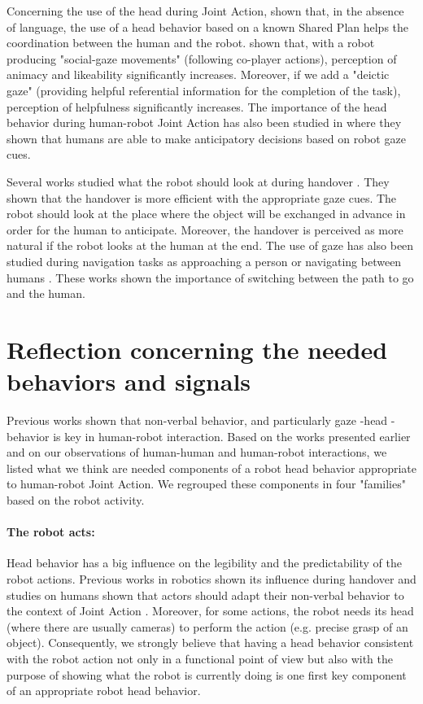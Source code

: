 \documentclass[english,a4paper,11pt,twoside]{StyleThese}
\begin{document}
Concerning the use of the head during Joint Action, \cite{lallee2013cooperative} shown that, in the absence of language, the use of a head behavior based on a known Shared Plan helps the coordination between the human and the robot. \cite{zaga2017simple} shown that, with a robot producing "social-gaze movements" (following co-player actions), perception of animacy and likeability significantly increases. Moreover, if we add a "deictic gaze" (providing helpful referential information for the completion of the task), perception of helpfulness significantly increases. The importance of the head behavior during human-robot Joint Action has also been studied in \cite{boucher2012reach} where they shown that humans are able to make anticipatory decisions based on robot gaze cues. 

Several works studied what the robot should look at during handover \cite{moon2014meet, gharbi2015toward}. They shown that the handover is more efficient with the appropriate gaze cues. The robot should look at the place where the object will be exchanged in advance in order for the human to anticipate. Moreover, the handover is perceived as more natural if the robot looks at the human at the end. The use of gaze has also been studied during navigation tasks as approaching a person \cite{fischer2016between} or navigating between humans \cite{khambhaita_hfr_2016}. These works shown the importance of switching between the path to go and the human.


\section{Reflection concerning the needed behaviors and signals}

\label{sec:reflection}

Previous works shown that non-verbal behavior, and particularly gaze -head - behavior is key in human-robot interaction. Based on the works presented earlier and on our observations of human-human and human-robot interactions, we listed what we think are needed components of a robot head behavior appropriate to human-robot Joint Action. We regrouped these components in four "families" based on the robot activity.

\paragraph{The robot acts:}
Head behavior has a big influence on the legibility and the predictability of the robot actions. Previous works in robotics shown its influence during handover \cite{moon2014meet, gharbi2015toward} and studies on humans shown that actors should adapt their non-verbal behavior to the context of Joint Action \cite{becchio2010toward, vesper2010minimal}. Moreover, for some actions, the robot needs its head (where there are usually cameras) to perform the action (e.g. precise grasp of an object). Consequently, we strongly believe that having a head behavior consistent with the robot action not only in a functional point of view but also with the purpose of showing what the robot is currently doing is one first key component of an appropriate robot head behavior.
\end{document}
